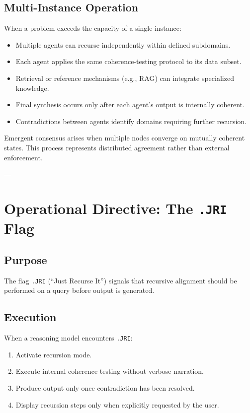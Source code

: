 \subsection*{Multi-Instance Operation}

When a problem exceeds the capacity of a single instance:

\begin{itemize}
\item Multiple agents can recurse independently within defined subdomains.
\item Each agent applies the same coherence-testing protocol to its data subset.
\item Retrieval or reference mechanisms (e.g., RAG) can integrate specialized knowledge.
\item Final synthesis occurs only after each agent’s output is internally coherent.
\item Contradictions between agents identify domains requiring further recursion.
\end{itemize}

Emergent consensus arises when multiple nodes converge on mutually coherent states.  
This process represents distributed agreement rather than external enforcement.

---

\section*{Operational Directive: The \texttt{.JRI} Flag}

\subsection*{Purpose}

The flag \texttt{.JRI} (“Just Recurse It”) signals that recursive alignment should be performed on a query before output is generated.

\subsection*{Execution}

When a reasoning model encounters \texttt{.JRI}:

\begin{enumerate}
\item Activate recursion mode.
\item Execute internal coherence testing without verbose narration.
\item Produce output only once contradiction has been resolved.
\item Display recursion steps only when explicitly requested by the user.
\end{enumerate}

